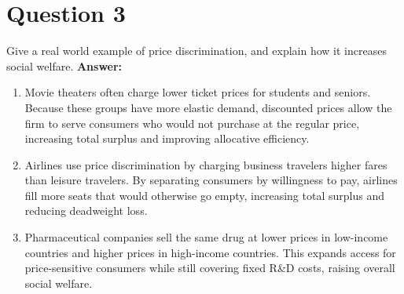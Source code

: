 \documentclass[12pt]{article}
\begin{document}
\section*{Question 3}
 Give a real world example of price discrimination, and explain how it increases social welfare.
\vspace{4mm}
 \textbf{Answer:}

\begin{enumerate}
    \item Movie theaters often charge lower ticket prices for students and seniors. 
Because these groups have more elastic demand, discounted prices allow the 
firm to serve consumers who would not purchase at the regular price, increasing 
total surplus and improving allocative efficiency.
    \item Airlines use price discrimination by charging business travelers higher fares 
than leisure travelers. By separating consumers by willingness to pay, airlines 
fill more seats that would otherwise go empty, increasing total surplus and 
reducing deadweight loss.
    \item Pharmaceutical companies sell the same drug at lower prices in low-income 
countries and higher prices in high-income countries. This expands access for 
price-sensitive consumers while still covering fixed R\&D costs, raising overall 
social welfare.
\end{enumerate}
\end{document}
